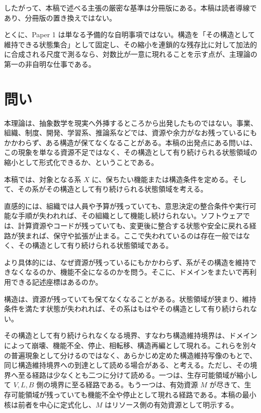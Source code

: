 \documentclass[12pt,a4paper]{article}
\begin{document}
したがって、本稿で述べる主張の厳密な基準は分冊版にある。本稿は読者導線であり、分冊版の置き換えではない。

とくに、Paper 1 は単なる予備的な自明事項ではない。構造を「その構造として維持できる状態集合」として固定し、その縮小を連鎖的な残存比に対して加法的に合成される尺度で測るなら、対数比が一意に現れることを示す点が、主理論の第一の非自明な仕事である。

\section{問い}\label{ux554fux3044}

本理論は、抽象数学を現実へ外挿するところから出発したものではない。事業、組織、制度、開発、学習系、推論系などでは、資源や余力がなお残っているにもかかわらず、ある構造が保てなくなることがある。本稿の出発点にある問いは、この現象を単なる資源不足ではなく、その構造として有り続けられる状態領域の縮小として形式化できるか、ということである。

本稿では、対象となる系 \(X\) に、保ちたい機能または構造条件を定める。そして、その系がその構造として有り続けられる状態領域を考える。

直感的には、組織では人員や予算が残っていても、意思決定の整合条件や実行可能な手順が失われれば、その組織として機能し続けられない。ソフトウェアでは、計算資源やコードが残っていても、変更後に整合する状態や安全に戻れる経路が狭まれば、保守や拡張が止まる。ここで失われているのは存在一般ではなく、その構造として有り続けられる状態領域である。

より具体的には、なぜ資源が残っているにもかかわらず、系がその構造を維持できなくなるのか、機能不全になるのかを問う。そこに、ドメインをまたいで再利用できる記述座標はあるのか。

構造は、資源が残っていても保てなくなることがある。状態領域が狭まり、維持条件を満たす状態が失われれば、その系はもはやその構造として有り続けられない。

その構造として有り続けられなくなる境界、すなわち構造維持境界は、ドメインによって崩壊、機能不全、停止、相転移、構造再編として現れる。これらを別々の普遍現象として分けるのではなく、あらかじめ定めた構造維持写像のもとで、同じ構造維持境界への到達として読める場合がある、と考える。ただし、その境界へ至る経路は少なくとも二つに分けて読める。一つは、生存可能領域が縮小して \(V,L,B\) 側の境界に至る経路である。もう一つは、有効資源 \(M\) が尽きて、生存可能領域が残っていても機能不全や停止として現れる経路である。本稿の最小核は前者を中心に定式化し、\(M\) はリソース側の有効資源として明示する。
\end{document}
